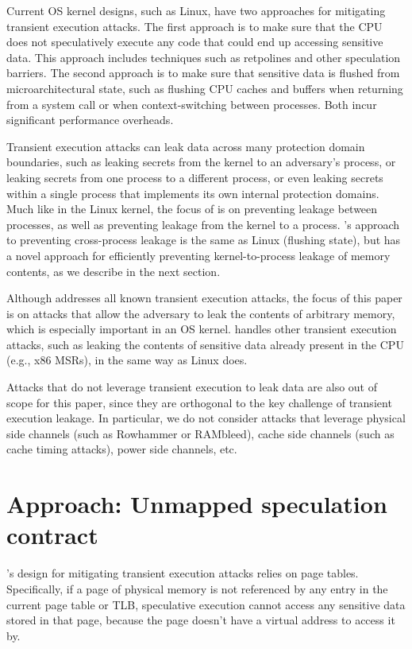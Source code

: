 Current OS kernel designs, such as Linux, have two approaches for
mitigating transient execution attacks.  The first approach is to make
sure that the CPU does not speculatively execute any code that could
end up accessing sensitive data.  This approach includes techniques such
as retpolines and other speculation barriers.  The second approach is to
make sure that sensitive data is flushed from microarchitectural state,
such as flushing CPU caches and buffers when returning from a system
call or when context-switching between processes.  Both incur significant
performance overheads.

Transient execution attacks can leak data across many protection domain
boundaries, such as leaking secrets from the kernel to an adversary's
process, or leaking secrets from one process to a different process,
or even leaking secrets within a single process that implements its
own internal protection domains.  Much like in the Linux kernel, the
focus of \sys is on preventing leakage between processes, as well as
preventing leakage from the kernel to a process.  \sys's approach to
preventing cross-process leakage is the same as Linux (flushing state),
but \sys has a novel approach for efficiently preventing kernel-to-process
leakage of memory contents, as we describe in the next section.

Although \sys addresses all known transient execution attacks, the focus
of this paper is on attacks that allow the adversary to leak the contents
of arbitrary memory, which is especially important in an OS kernel.
\sys handles other transient execution attacks, such as leaking the
contents of sensitive data already present in the CPU (e.g., x86 MSRs),
in the same way as Linux does.

Attacks that do not leverage transient execution to leak data are also
out of scope for this paper, since they are orthogonal to the key
challenge of transient execution leakage.  In particular, we do not
consider attacks that leverage physical side channels (such
as Rowhammer or RAMbleed), cache side channels (such as cache timing
attacks), power side channels, etc.


\section*{Approach: Unmapped speculation contract}

\sys's design for mitigating transient execution attacks relies
on page tables.  Specifically, if a page of physical
memory is not referenced by any entry in the current page table or
TLB, speculative execution cannot access any sensitive data stored in
that page, because the page doesn't have a virtual address to access
it by.

